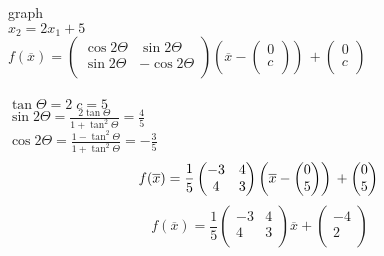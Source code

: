 \documentclass [a4paper,12pt]{article}
\begin{document}
\section{} %
graph\\
$x_2 = 2x_1 + 5$\\
$f({\overline{x}})= \left(
\begin{matrix}
\cos{2\Theta} & \sin{2\Theta}\\
\sin{2\Theta} & -\cos{2\Theta}\\
\end{matrix}
\right
)
\left ( {\overline{x}} -
\left(
\begin{matrix}
0\\
c\\
\end{matrix}
\right
)
\right ) \, +
\left(
\begin{matrix}
0\\
c\\
\end{matrix}
\right
)
$\\
\\
$\tan{\Theta} = 2\;  c = 5$\\
$\sin{2\Theta} = \frac{2\tan{\Theta}}{1+\tan^2{\Theta}}=\frac{4}{5}$\\
$\cos{2\Theta} = \frac{1-\tan^2{\Theta}}{1 + \tan^2{\Theta}} = - \frac{3}{5}$\\
\begin{equation*}
f({\overline{x}})= \frac{1}{5}\left(
\begin{matrix}
-3 & 4\\
4 & 3\\
\end{matrix}
\right
)
\left ( {\overline{x}} -
\left(
\begin{matrix}
0\\
5\\
\end{matrix}
\right
)
\right ) \, +
\left(
\begin{matrix}
0\\
5\\
\end{matrix}
\right
)\\
\end{equation*}
\begin{equation*}
f({\overline{x}})= \frac{1}{5}\left(
\begin{matrix}
-3 & 4\\
4 & 3\\
\end{matrix} \right )
{\overline{x}} +
\left(
\begin{matrix}
-4\\
2\\
\end{matrix}
\right
)
\end{equation*}
\end{document}
